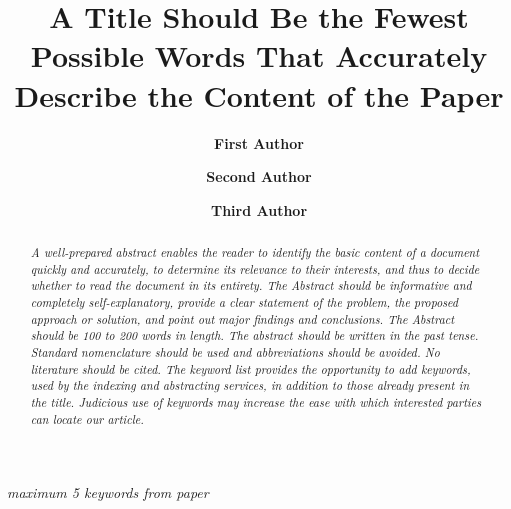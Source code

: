 \documentclass{iaesarticle3}
\author[*]{\bfseries First Author}
\author[ ]{\bfseries Second Author}
\author[ ]{\bfseries Third Author}
\affil[ ]{Institution/affiliation}
\affil[ ]{addres, telp/fax of institution/affiliation}
\affil[*]{corresponding author, e-mail: xxxx@xxxx.xxx}
\title{A Title Should Be the Fewest Possible Words That Accurately Describe the Content of the Paper}
\begin{document}
\setlength{\parindent}{1.27cm}

\pagestyle{fancy}
\fancyhfoffset{0cm}


\maketitle


\begin{abstract}
\textit{\indent
A well-prepared abstract enables the reader to identify the basic content of a document quickly and accurately, to determine its relevance to their interests, and thus to decide whether to read the document in its entirety. The Abstract should be informative and completely self-explanatory, provide a clear statement of the problem, the proposed approach or solution, and point out major findings and conclusions. The Abstract should be 100 to 200 words in length. The abstract should be written in the past tense. Standard nomenclature should be used and abbreviations should be avoided. No literature should be cited. The keyword list provides the opportunity to add keywords, used by the indexing and abstracting services, in addition to those already present in the title. Judicious use of keywords may increase the ease with which interested parties can locate our article.
}
\end{abstract}

\begin{keyword}
\textit{
maximum 5 keywords from paper
}
\end{keyword}


\end{document}
